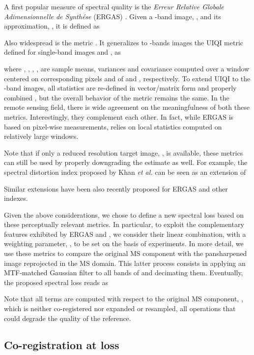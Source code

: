 \documentclass[journal]{IEEEtran}
\begin{document}
\newcommand{\x}{{\bf x}}
\newcommand{\y}{{\bf y}}
A first popular measure of spectral quality is the {\em Erreur Relative Globale Adimensionnelle de Synth{\'e}se} (ERGAS) \cite{Wald2002}.
Given a -band image, , and its approximation, , it is defined as

Also widespread is the  metric \cite{Garzelli2009}.
It generalizes to -bands images the UIQI metric defined for single-band images  and , as

where , , , ,  are sample means, variances and covariance
computed over a  window centered on corresponding pixels  and  of  and , respectively.
To extend UIQI to the -band images, all statistics are re-defined in vector/matrix form and properly combined \cite{Garzelli2009},
but the overall behavior of the metric remains the same.
In the remote sensing field, there is wide agreement on the meaningfulness of both these metrics.
Interestingly, they complement each other.
In fact, while ERGAS is based on pixel-wise measurements,  relies on local statistics computed on relatively large windows.

Note that if only a reduced resolution target image, , is available,
these metrics can still be used by properly downgrading the estimate  as well.
For example, the spectral distortion index  proposed by Khan {\em et al.} \cite{Khan2009}
can be seen as an extension of 

Similar extensions have been also recently proposed \cite{Scarpa2022a} for ERGAS and other indexes.

Given the above considerations, we chose to define a new spectral loss based on these perceptually relevant metrics.
In particular, to exploit the complementary features exhibited by ERGAS and , we consider
their linear combination, with a weighting parameter, , to be set on the basis of experiments.
In more detail, we use these metrics to compare the original MS component with the pansharpened image reprojected in the MS domain.
This latter process consists in applying an MTF-matched Gaussian filter to all bands of  and decimating them.
Eventually, the proposed spectral loss reads as

Note that all terms are computed with respect to the original MS component, ,
which is neither co-registered nor expanded or resampled, all operations that could degrade the quality of the reference.


\subsection{Co-registration at loss}
\end{document}
